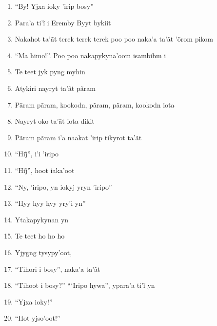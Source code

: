\begin{enumerate}
 \item ``By! Yjxa ioky 'irip bosy''

 \item Para’a ti’ĩ i Eremby Byyt bykiit

 \item Nakahot ta'ãt terek terek terek poo poo naka'a ta'ãt 'õrom pikom

 \item ``Ma himo!''. Poo poo nakapykyna'oom isambibm i

 \item Te teet jyk pyng myhin

 \begin{center}\end{center}

 \item Atykiri nayryt ta'ãt pãram

 \item Pãram pãram, kookodn, pãram, pãram, kookodn iota

 \item Nayryt oko ta'ãt iota dikit

 \item Pãram pãram i'a naakat 'irip tikyrot ta'ãt

 \item ``Hij̃'', i’i ’iripo

 \item ``Hij̃'', hoot iaka’oot

 \item ``Ny, 'iripo, yn iokyj yryn 'iripo''

 \item ``Hyy hyy hyy yry'i yn''

 \item Ytakapykynan yn

 \item Te teet ho ho ho

 \item Yjygng tysypy'oot,

 \item ``Tihori i bosy'', naka'a ta'ãt

 \item ``Tihoot i bosy?'' ``‘Iripo hywa'', ypara’a ti’ĩ yn

 \item ``Yjxa ioky!''

 \item ``Hot yjso'oot!''

 \begin{center}\end{center}


\end{enumerate}
